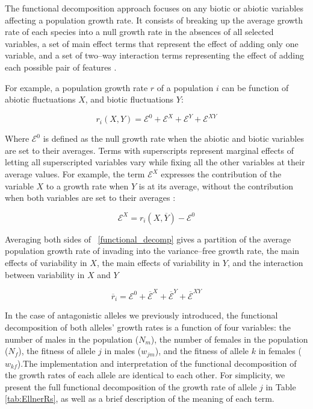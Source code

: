 \documentclass[]{article}
\begin{document}
The functional decomposition approach focuses on any biotic or abiotic variables affecting a population growth rate. It consists of breaking up the average growth rate of each species into a null growth rate in the absences of all selected variables, a set of main effect terms that represent the effect of adding only one variable, and a set of two--way interaction terms representing the effect of adding each possible pair of features \citep{ellner_expanded_2019}.

For example, a population growth rate $r$ of a population $i$ can be function of abiotic fluctuations $X$, and biotic fluctuations $Y$:

\begin{equation}
   r_{i}(X,Y) = \mathcal{E}^{0} + \mathcal{E}^{X}+ \mathcal{E}^{Y}+ \mathcal{E}^{XY}
   \label{functional_decomp}
\end{equation}

Where $\mathcal{E}^0$ is defined as the null growth rate when the abiotic and biotic variables are set to their averages. Terms with superscripts represent marginal effects of letting all superscripted variables vary while fixing all the other variables at their average values. For example, the term $\mathcal{E}^X$ expresses the contribution of the variable $X$ to a growth rate when $Y$ is at its average, without the contribution when both variables are set to their averages :

\begin{equation}
  \mathcal{E}^{X} = r_{i}(X,\overline{Y}) - \mathcal{E}^{0}
\end{equation}


Averaging both sides of ~\ref{functional_decomp} gives a partition of the average population growth rate of invading into the variance--free growth rate, the main effects of variability in $X$, the main effects of variability in $Y$, and the interaction between variability in $X$ and $Y$

\begin{equation}
    \overline{r}_{i}= \mathcal{E}^{0} + \overline{\mathcal{E}}^{X}+ \overline{\mathcal{E}}^{Y}+ \overline{\mathcal{E}}^{XY}
   \label{functional_decomp_2}
\end{equation}

In the case of antagonistic alleles we previously introduced, the functional decomposition of both alleles' growth rates is a function of four variables: the number of males in the population ($N_{m}$), the number of females in the population ($N_{f}$), the fitness of allele $j$ in males ($w_{jm}$), and the fitness of allele $k$ in females ($w_{kf}$).The implementation and interpretation of the functional decomposition of the growth rates of each allele are identical to each other. For simplicity,  we present the full functional decomposition of the growth rate of allele $j$ in Table \ref{tab:EllnerRs}, as well as a brief description of the meaning of each term.
\end{document}
